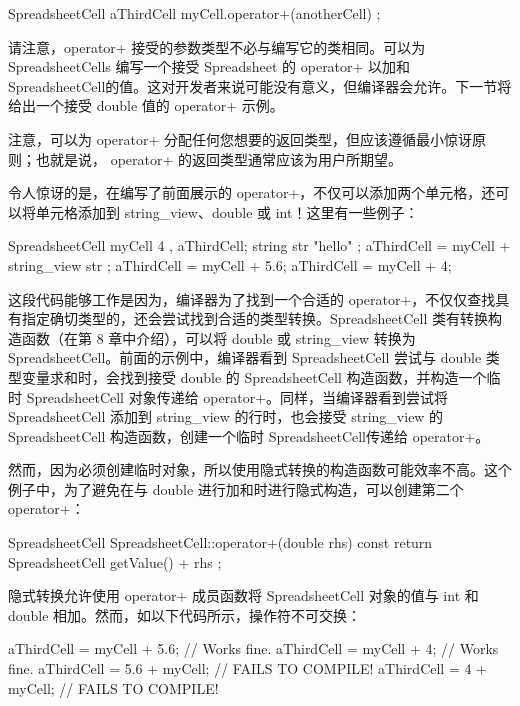 \begin{cpp}
SpreadsheetCell aThirdCell { myCell.operator+(anotherCell) };
\end{cpp}

请注意，operator+ 接受的参数类型不必与编写它的类相同。可以为 SpreadsheetCells 编写一个接受 Spreadsheet 的 operator+ 以加和 SpreadsheetCell的值。这对开发者来说可能没有意义，但编译器会允许。下一节将给出一个接受 double 值的 operator+ 示例。

注意，可以为 operator+ 分配任何您想要的返回类型，但应该遵循最小惊讶原则；也就是说， operator+ 的返回类型通常应该为用户所期望。


令人惊讶的是，在编写了前面展示的 operator+，不仅可以添加两个单元格，还可以将单元格添加到 string\_view、double 或 int！这里有一些例子：

\begin{cpp}
SpreadsheetCell myCell { 4 }, aThirdCell;
string str { "hello" };
aThirdCell = myCell + string_view{ str };
aThirdCell = myCell + 5.6;
aThirdCell = myCell + 4;
\end{cpp}

这段代码能够工作是因为，编译器为了找到一个合适的 operator+，不仅仅查找具有指定确切类型的，还会尝试找到合适的类型转换。SpreadsheetCell 类有转换构造函数（在第 8 章中介绍），可以将 double 或 string\_view 转换为 SpreadsheetCell。前面的示例中，编译器看到 SpreadsheetCell 尝试与 double 类型变量求和时，会找到接受 double 的 SpreadsheetCell 构造函数，并构造一个临时 SpreadsheetCell 对象传递给 operator+。同样，当编译器看到尝试将 SpreadsheetCell 添加到 string\_view 的行时，也会接受 string\_view 的 SpreadsheetCell 构造函数，创建一个临时 SpreadsheetCell传递给 operator+。

然而，因为必须创建临时对象，所以使用隐式转换的构造函数可能效率不高。这个例子中，为了避免在与 double 进行加和时进行隐式构造，可以创建第二个 operator+：

\begin{cpp}
SpreadsheetCell SpreadsheetCell::operator+(double rhs) const
{
    return SpreadsheetCell { getValue() + rhs };
}
\end{cpp}


隐式转换允许使用 operator+ 成员函数将 SpreadsheetCell 对象的值与 int 和 double 相加。然而，如以下代码所示，操作符不可交换：

\begin{cpp}
aThirdCell = myCell + 5.6; // Works fine.
aThirdCell = myCell + 4; // Works fine.
aThirdCell = 5.6 + myCell; // FAILS TO COMPILE!
aThirdCell = 4 + myCell; // FAILS TO COMPILE!
\end{cpp}

